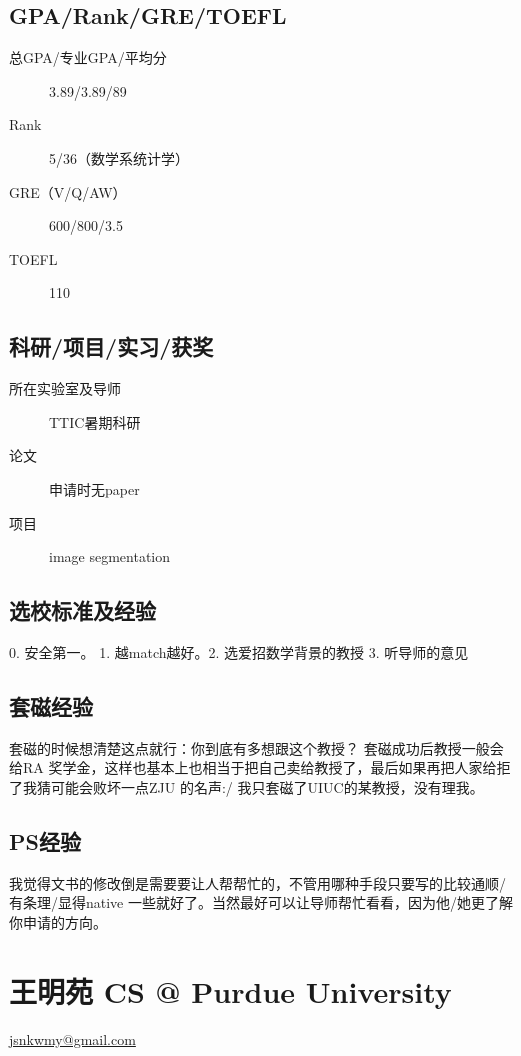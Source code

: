 \documentclass[11pt,fleqn,openany]{book} %
\begin{document}
\subsection*{GPA/Rank/GRE/TOEFL}
\begin{description}
\item[总GPA/专业GPA/平均分] 3.89/3.89/89
\item[Rank] 5/36（数学系统计学）
\item[GRE（V/Q/AW）] 600/800/3.5
\item[TOEFL] 110
\end{description}

\subsection*{科研/项目/实习/获奖}
\begin{description}
\item[所在实验室及导师] TTIC暑期科研
\item[论文] 申请时无paper
\item[项目] image segmentation
\end{description}
\subsection*{选校标准及经验}
0. 安全第一。 1. 越match越好。2. 选爱招数学背景的教授 3. 听导师的意见
\subsection*{套磁经验}
套磁的时候想清楚这点就行：你到底有多想跟这个教授？ 套磁成功后教授一般会给RA
奖学金，这样也基本上也相当于把自己卖给教授了，最后如果再把人家给拒了我猜可能会败坏一点ZJU 的名声:/
我只套磁了UIUC的某教授，没有理我。
\subsection*{PS经验}
我觉得文书的修改倒是需要要让人帮帮忙的，不管用哪种手段只要写的比较通顺/有条理/显得native
一些就好了。当然最好可以让导师帮忙看看，因为他/她更了解你申请的方向。
\clearpage
\section{王明苑 CS @ Purdue University}
\hfill \href{mailto:jsnkwmy@gmail.com}{jsnkwmy@gmail.com}
\end{document}
